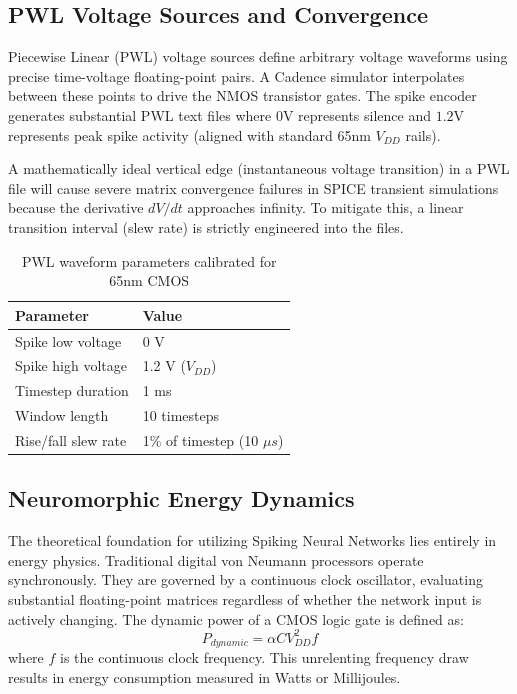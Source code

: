 \documentclass{ieeeaccess}
\begin{document}
\subsection{PWL Voltage Sources and Convergence}

Piecewise Linear (PWL) voltage sources define arbitrary voltage waveforms using precise time-voltage floating-point pairs. A Cadence simulator interpolates between these points to drive the NMOS transistor gates. The spike encoder generates substantial PWL text files where $0\text{V}$ represents silence and $1.2\text{V}$ represents peak spike activity (aligned with standard 65nm $V_{DD}$ rails). 

A mathematically ideal vertical edge (instantaneous voltage transition) in a PWL file will cause severe matrix convergence failures in SPICE transient simulations because the derivative $dV/dt$ approaches infinity. To mitigate this, a linear transition interval (slew rate) is strictly engineered into the files.

\begin{table}[!t]
\centering
\caption{PWL waveform parameters calibrated for 65nm CMOS}
\label{tab:pwlparams}
\begin{tabular}{|p{}|p{}|}
\hline
\textbf{Parameter} & \textbf{Value} \\
\hline
Spike low voltage & 0 V \\
\hline
Spike high voltage & 1.2 V ($V_{DD}$) \\
\hline
Timestep duration & 1 ms \\
\hline
Window length & 10 timesteps \\
\hline
Rise/fall slew rate & 1\% of timestep (10 $\mu s$) \\
\hline
\end{tabular}
\end{table}

\subsection{Neuromorphic Energy Dynamics}

The theoretical foundation for utilizing Spiking Neural Networks lies entirely in energy physics. Traditional digital von Neumann processors operate synchronously. They are governed by a continuous clock oscillator, evaluating substantial floating-point matrices regardless of whether the network input is actively changing. The dynamic power of a CMOS logic gate is defined as:
\begin{equation}
P_{dynamic} = \alpha C V_{DD}^2 f
\end{equation}
where $f$ is the continuous clock frequency. This unrelenting frequency draw results in energy consumption measured in Watts or Millijoules.
\end{document}
